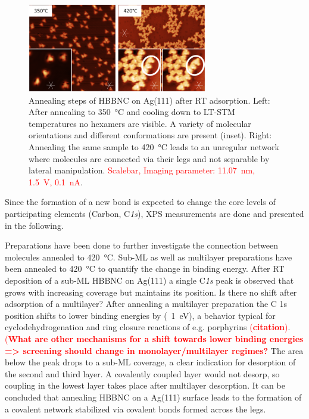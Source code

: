 \begin{figure}[] \centering
	\includegraphics[width=0.7\textwidth]{./images/hbbnc-ag-111-annealed}
	\caption{Annealing steps of HBBNC on Ag(111) after RT adsorption. Left: After annealing to \SI{350}{\celsius} and cooling down to LT-STM temperatures no hexamers are visible. A variety of molecular orientations and different conformations are present (inset). Right: Annealing the same sample to \SI{420}{\celsius} leads to an unregular network where molecules are connected via their legs and not separable by lateral manipulation. \textcolor{red}{Scalebar, Imaging parameter: \SI{11.07}{\nano \meter}, \SI{1.5}{\volt}, \SI{0.1}{\nano \ampere}}.}
	\label{}
\end{figure}

Since the formation of a new bond is expected to change the core levels of participating elements (Carbon, C\textit{1s}), XPS measurements are done and presented in the following.

Preparations have been done to further investigate the connection between molecules annealed to \SI{420}{\celsius}. Sub-ML as well as multilayer preparations have been annealed to \SI{420}{\celsius} to quantify the change in binding energy. After RT deposition of a sub-ML HBBNC on Ag(111) a single C\textit{1s} peak is observed that grows with increasing coverage but maintains its position.
Is there no shift after adsorption of a multilayer?
After annealing a multilayer preparation the C 1s position shifts to lower binding energies by (~\SI{1}{\eV}), a behavior typical for cyclodehydrogenation and ring closure reactions of e.g. porphyrins \textcolor{red}{(\textbf{citation})}. \textcolor{red}{(\textbf{What are other mechanisms for a shift towards lower binding energies => screening should change in monolayer/multilayer regimes?}} The area below the peak drops to a sub-ML coverage, a clear indication for desorption of the second and third layer. A covalently coupled layer would not desorp, so coupling in the lowest layer takes place after multilayer desorption.
It can be concluded that annealing HBBNC on a Ag(111) surface leads to the formation of a covalent network stabilized via covalent bonds formed across the legs.

